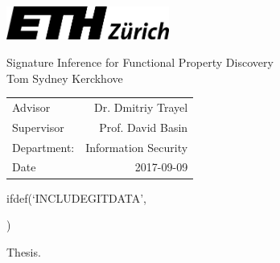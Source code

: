 \documentclass[a4paper]{article}
\begin{document}
\begin{titlepage}
  \includegraphics[width=0.4\textwidth]{assets/eth-logo.png}
  \vfill
  \begin{center}
    {\Huge Signature Inference for Functional Property Discovery}\\[\baselineskip]
    {\Large Tom Sydney Kerckhove}
  \end{center}
  \vfill
  \begin{flushright}
    \begin{tabular}{lr}
      Advisor & Dr. Dmitriy Trayel\\
      Supervisor & Prof. David Basin\\
      Department: & Information Security\\
      Date & 2017-09-09\\
    \end{tabular}
  \end{flushright}
\end{titlepage}

\tableofcontents
\newpage

ifdef(`INCLUDEGITDATA',




  )

Thesis.


\end{document}
